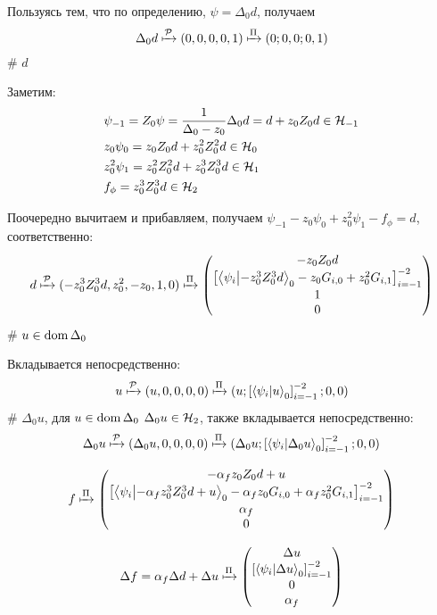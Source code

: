 \begin{elist}
Пользуясь тем, что по определению, $\psi = \Delta_0 d$, получаем
\[
\Delta_0 d \xmapsto[]{\mathcal{P}} (0, 0, 0, 0, 1) \xmapsto[]{\Pi} (0; 0, 0; 0, 1)
\]
# $d$

Заметим:
\begin{align*}
& \psi_{-1} = Z_0 \psi = \frac{1}{\Delta_0 - z_0} \Delta_0 d = d + z_0 Z_0 d \in \mathcal{H}_{-1} \\
& z_0 \psi_{0} = z_0 Z_0 d + z_0^2 Z_0^2 d \in \mathcal{H}_{0} \\
& z_0^2 \psi_{1} = z_0^2 Z_0^2 d + z_0^3 Z_0^3 d \in \mathcal{H}_{1} \\
& f_\phi = z_0^3 Z_0^3 d \in \mathcal{H}_{2}
\end{align*}

Поочередно вычитаем и прибавляем, получаем  $\psi_{-1} - z_0 \psi_0 + z_0^2 \psi_1 - f_\phi =  d$, соответственно:
\[
d \xmapsto[]{\mcP} (-z_0^3 Z_0^3 d, z_0^2, -z_0, 1, 0) \xmapsto[]{\Pi}
\begin{pmatrix}
-z_0 Z_0 d \\
\left[ \ip{\psi_i}{-z_0^3 Z_0^3 d}_0 -z_0 G_{i, 0} + z_0^2 G_{i, 1}\right]_{i = -1}^{-2}\\
1\\
0
\end{pmatrix}
\]
# $u \in \operatorname{dom} \Delta_0$

Вкладывается непосредственно:
\[
u \xmapsto[]{\mcP} (u, 0, 0, 0, 0) \xmapsto[]{\Pi} (u;\left[ \ip{\psi_i}{u}_0 \right]_{i = -1}^{-2}; 0, 0)
\]
# $\Delta_0 u$, для $u \in \operatorname{dom} \Delta_0$
$\Delta_0 u \in \mathcal{H}_{2}$, также вкладывается непосредственно:
\[
\Delta_0 u \xmapsto[]{\mcP} (\Delta_0 u, 0, 0, 0, 0) \xmapsto[]{\Pi} (\Delta_0 u; \left[ \ip{\psi_i}{\Delta_0 u}_0 \right]_{i = -1}^{-2}; 0, 0)\]
\end{elist} %


\[
f \xmapsto[]{\Pi}
\begin{pmatrix}
- \alpha_f z_0 Z_0 d + u \\
\left[ \ip{\psi_i}{- \alpha_f z_0^3 Z_0^3 d + u}_0 - \alpha_f z_0 G_{i, 0} + \alpha_f z_0^2 G_{i, 1} \right]_{i = -1}^{-2} \\
\alpha_f \\
0
\end{pmatrix}
\]

\[
\Delta f = \alpha_f \Delta d + \Delta u  \xmapsto[]{\Pi}
\begin{pmatrix}
\Delta u \\
\left[ \ip{\psi_i}{\Delta u}_0\right]_{i = -1}^{-2} \\
0 \\
\alpha_f
\end{pmatrix}
\]

